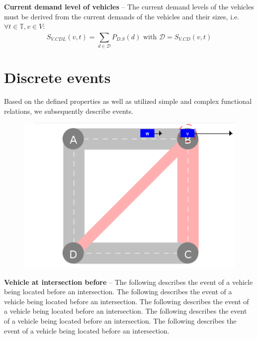 \documentclass[graybox]{svmult}
\begin{document}
\vspace{2mm}
\noindent
\textbf{Current demand level of vehicles}
--
The current demand levels of the vehicles must be derived from the current demands of the vehicles and their sizes, i.e.\ $\forall t \in \mathbb{T}, v \in V:$
\[
S_{V.CDL}(v,t)=\sum_{d \in \mathcal{D}}^{}P_{D.S}(d) \textrm{ with } \mathcal{D}=S_{V.CD}(v,t)
\]

\section{Discrete events}
\label{sec:events}
Based on the defined properties as well as utilized simple and complex functional relations, we subsequently describe events.
\vspace{4mm}
\begin{figure}
	\centering
		\includegraphics[scale=0.35]{../../events/vehicle-at-intersection-before.png}
\end{figure}

\noindent
\textbf{Vehicle at intersection before}
--
The following describes the event of a vehicle being located before an intersection. 
The following describes the event of a vehicle being located before an intersection. 
The following describes the event of a vehicle being located before an intersection. 
The following describes the event of a vehicle being located before an intersection. 
The following describes the event of a vehicle being located before an intersection. 
\end{document}
